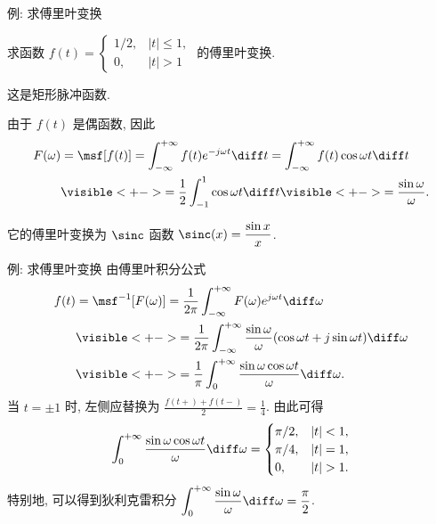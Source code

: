 \begin{frame}{例: 求傅里叶变换}
	\onslide<+->
	\begin{example}
		求函数 $f(t)=
			\begin{cases}
				1/2, & |t|\le 1,\\
				0, & |t|>1
			\end{cases}$
		的傅里叶变换.
	\end{example}
	\onslide<+->
	这是矩形脉冲函数.
	\onslide<+->
	\begin{solution}
		由于 $f(t)$ 是偶函数, 因此
		\begin{align*}
			F(\omega)&=\msf[f(t)]
			=\int_{-\infty}^{+\infty}f(t)e^{-j\omega t}\diff t
			=\int_{-\infty}^{+\infty}f(t)\cos{\omega t}\diff t\\
			&\visible<+->{=\frac12\int_{-1}^1\cos{\omega t}\diff t}
				\visible<+->{=\frac{\sin \omega}{\omega}.}
		\end{align*}
	\end{solution}
	\onslide<+->
	它的傅里叶变换为 $\sinc$ 函数 $\sinc(x)=\dfrac{\sin x}x$.
\end{frame}


\begin{frame}{例: 求傅里叶变换}
	\onslide<+->
	由傅里叶积分公式
	\begin{align*}
		f(t)&=\msf^{-1}[F(\omega)]=\frac1{2\pi}\int_{-\infty}^{+\infty}F(\omega)e^{j\omega t}\diff\omega\\
		&\visible<+->{=\frac1{2\pi}\int_{-\infty}^{+\infty}\frac{\sin\omega}{\omega}(\cos\omega t+j\sin\omega t)\diff \omega}\\
		&\visible<+->{=\frac1\pi\int_0^{+\infty}\frac{\sin\omega\cos\omega t}{\omega}\diff \omega.}
	\end{align*}
	\onslide<+->
	当 $t=\pm1$ 时, 左侧应替换为 $\frac{f(t+)+f(t-)}2=\frac14$.
	\onslide<+->
	由此可得
	\[\int_0^{+\infty}\frac{\sin \omega\cos\omega t}\omega\diff\omega=\begin{cases}
		\pi/2,&|t|<1,\\
		\pi/4,&|t|=1,\\
		0,&|t|>1.
	\end{cases}\]
	\onslide<+->
	特别地, 可以得到狄利克雷积分
	$\displaystyle\int_0^{+\infty}\frac{\sin\omega}\omega\diff\omega=\frac\pi2$.
\end{frame}


